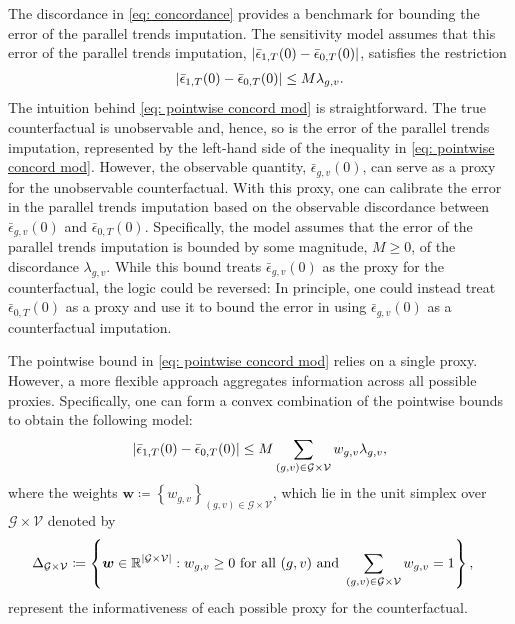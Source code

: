 \documentclass[twoside,11pt]{article}
\begin{document}
The discordance in \eqref{eq: concordance} provides a benchmark for bounding the error of the parallel trends imputation. The sensitivity model assumes that this error of the parallel trends imputation, $\lvert\bar{\epsilon}_{1,T}(0) - \bar{\epsilon}_{0,T}(0)\rvert$, satisfies the restriction
\begin{align} \label{eq: pointwise concord mod}
\lvert\bar{\epsilon}_{1,T}(0) - \bar{\epsilon}_{0,T}(0)\rvert \leq M \lambda_{g,v}.
\end{align}
The intuition behind \eqref{eq: pointwise concord mod} is straightforward. The true counterfactual is unobservable and, hence, so is the error of the parallel trends imputation, represented by the left-hand side of the inequality in \eqref{eq: pointwise concord mod}. However, the observable quantity, $\bar{\epsilon}_{g,v}(0)$, can serve as a proxy for the unobservable counterfactual. With this proxy, one can calibrate the error in the parallel trends imputation based on the observable discordance between $\bar{\epsilon}_{g,v}(0)$ and $\bar{\epsilon}_{0,T}(0)$. Specifically, the model assumes that the error of the parallel trends imputation is bounded by some magnitude, $M \geq 0$, of the discordance $\lambda_{g,v}$. While this bound treats $\bar{\epsilon}_{g,v}(0)$ as the proxy for the counterfactual, the logic could be reversed: In principle, one could instead treat $\bar{\epsilon}_{0,T}(0)$ as a proxy and use it to bound the error in using $\bar{\epsilon}_{g,v}(0)$ as a counterfactual imputation.

The pointwise bound in \eqref{eq: pointwise concord mod} relies on a single proxy. However, a more flexible approach aggregates information across all possible proxies. Specifically, one can form a convex combination of the pointwise bounds to obtain the following model:
\begin{align} \label{eq: sens model I}
\lvert\bar{\epsilon}_{1,T}(0) - \bar{\epsilon}_{0,T}(0)\rvert \leq M \sum \limits_{(g,v) \in \mathcal{G} \times \mathcal{V}} w_{g,v} \lambda_{g,v},
\end{align}
where the weights $\bm{w} \coloneqq \left\{w_{g,v}\right\}_{(g,v) \in \mathcal{G} \times \mathcal{V}}$, which lie in the unit simplex over $\mathcal{G} \times \mathcal{V}$ denoted by
\begin{equation} \label{eq: unit simplex over G x V}
\begin{split}
\Delta_{\mathcal{G} \times \mathcal{V}} & \coloneqq \left\{\bm{w} \in \operatorname{\mathbb{R}}^{\lvert\mathcal{G} \times \mathcal{V}\rvert} : w_{g,v} \geq 0 \text{ for all } (g,v) \text{ and } \sum \limits_{(g,v) \in \mathcal{G} \times \mathcal{V}} w_{g,v} = 1\right\},
\end{split}
\end{equation}
represent the informativeness of each possible proxy for the counterfactual.
\end{document}
